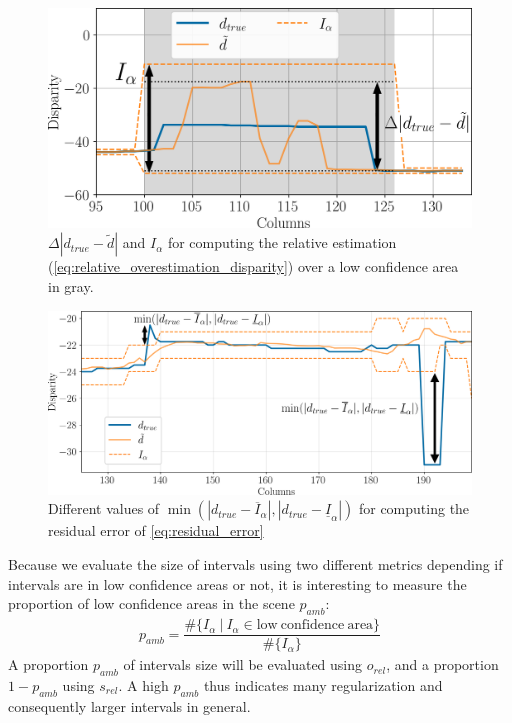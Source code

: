 \begin{figure}
    \centering
    \includegraphics[width=0.8\linewidth]{Images/Chap_5/relative_overestimation_row_230.png}
    \caption{$\Delta|d_{true}-\tilde{d}|$ and $I_\alpha$ for computing the relative estimation (\cref{eq:relative_overestimation_disparity}) over a low confidence area in gray.}
    \label{fig:relative_overestimation}
\end{figure}

\begin{figure}
    \centering
    \includegraphics[width=0.8\linewidth]{Images/Chap_5/residual_error_row_108.png}
    \caption{Different values of $\min(|d_{true}-\overline{I}_\alpha|, |d_{true}-\underline{I}_\alpha|)$ for computing the residual error of \cref{eq:residual_error}}
    \label{fig:residual_error}
\end{figure}

Because we evaluate the size of intervals using two different metrics depending if intervals are in low confidence areas or not, it is interesting to measure the proportion of low confidence areas in the scene $p_{amb}$:
\begin{align}
    p_{amb} = \dfrac{\#\{I_\alpha ~|~I_\alpha\in\mathrm{low~confidence~area}\}}{\#\{I_\alpha\}}
\end{align}
A proportion $p_{amb}$ of intervals size will be evaluated using $o_{rel}$, and a proportion $1-p_{amb}$ using $s_{rel}$. A high $p_{amb}$ thus indicates many regularization and consequently larger intervals in general.

